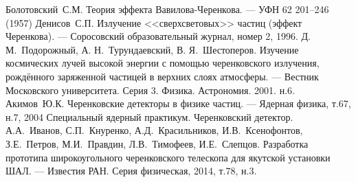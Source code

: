 \documentclass[14pt, a4paper]{article}
\begin{document}
	\tableofcontents
	
	\newpage
	
	\begin{thebibliography}{0}
		Болотовский~С.М.
		Теория эффекта Вавилова-Черенкова. --- УФН 62 201–246 (1957)
			Денисов~С.П.
		Излучение <<сверхсветовых>> частиц (эффект Черенкова). --- Соросовский образовательный журнал, номер 2, 1996.
		 Д. М.~Подорожный, А. Н.~Турундаевский, В. Я.~Шестоперов. Изучение космических лучей высокой энергии с помощью черенковского излучения, рождённого заряженной частицей в верхних слоях атмосферы. --- Вестник Московского университета. Серия	3. Физика. Астрономия.	2001. н.6.
		Акимов~Ю.К.
		Черенковские детекторы в физике частиц. --- Ядерная физика, т.67, н.7, 2004
		Специальный ядерный практикум.
		Черенковский детектор.
		А.А.~Иванов, С.П.~Кнуренко, А.Д.~Красильников, И.В.~Ксенофонтов,
		З.Е.~Петров, М.И.~Правдин, Л.В.~Тимофеев, И.Е.~Слепцов.
		Разработка прототипа широкоугольного черенковского телескопа для якутской установки ШАЛ. --- Известия РАН. Серия физическая, 2014, т.78, н.3.
	\end{thebibliography}
\end{document}
